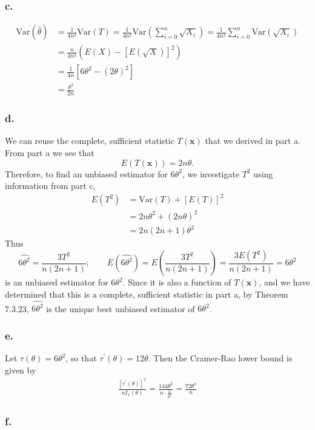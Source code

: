 \documentclass{article}
\begin{document}
\subsubsection*{c.}
\begin{align*}
\mathrm{Var}{(\hat{\theta})} &= \frac{1}{4n^2}\mathrm{Var}(T) = \frac{1}{4n^2}\mathrm{Var}\left(\sum_{i=0}^n \sqrt{X_i}\right) = \frac{1}{4n^2}\sum_{i=0}^n \mathrm{Var}(\sqrt{X_i})\\
&=\frac{n}{4n^2}\left(E(X)-\left[E(\sqrt{X})\right]^2\right) \\
&=\frac{1}{4n}\left[6\theta^2-(2\theta)^2\right] \\
&= \frac{\theta^2}{2n}
\end{align*}

\subsubsection*{d.}
We can reuse the complete, sufficient statistic $T(\mathbf{x})$ that we derived in part a. From part a we see that 
\[E\left(T(\mathbf{x})\right)=2n\theta.\]
Therefore, to find an unbiased estimator for $6\theta^2$, we investigate $T^2$ using information from part c,
\begin{align*}
E\left(T^2\right) &= \mathrm{Var}(T) + \left[E(T)\right]^2 \\
&=2n\theta^2 + (2n\theta)^2 \\
&=2n(2n+1)\theta^2
\end{align*}
Thus \[\widehat{6\theta^2} = \frac{3T^2}{n(2n+1)}; \qquad E\left(\widehat{6\theta^2}\right) = E\left(\frac{3T^2}{n(2n+1)}\right) = \frac{3E\left(T^2\right)}{n(2n+1)} = 6\theta^2\] 
is an unbiased estimator for $6\theta^2$. Since it is also a function of $T(\mathbf{x})$, and we have determined that this is a complete, sufficient statistic in part a, by Theorem 7.3.23, $\widehat{6\theta^2}$ is the unique best unbiased estimator of $6\theta^2$.

\subsubsection*{e.}
Let $\tau(\theta) = 6\theta^2$, so that $\tau^\prime(\theta) = 12\theta$. Then the Cramer-Rao lower bound is given by 
\begin{align*}
\frac{\left[\tau^\prime(\theta)\right]^2}{nI_1(\theta)} = \frac{144\theta^2}{n\cdot\frac{2}{\theta^2}} = \frac{72\theta^4}{n}
\end{align*}

\subsubsection*{f.}
\end{document}

